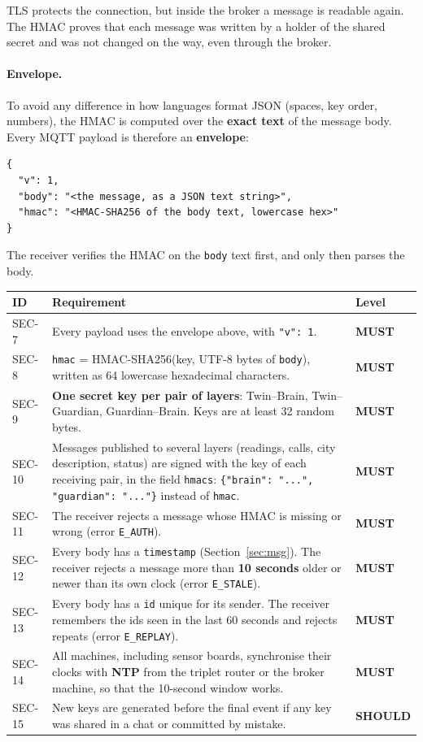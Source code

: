 \documentclass[11pt,a4paper]{article}
\newcommand{\code}[1]{\texttt{#1}}
\newcommand{\MUST}{\textbf{\textcolor{must}{MUST}}}
\newcommand{\SHOULD}{\textbf{\textcolor{should}{SHOULD}}}
\begin{document}
TLS protects the connection, but inside the broker a message is readable again. The HMAC proves that each message was written by a holder of the shared secret and was not changed on the way, even through the broker.

\paragraph{Envelope.} To avoid any difference in how languages format JSON (spaces, key order, numbers), the HMAC is computed over the \textbf{exact text} of the message body. Every MQTT payload is therefore an \textbf{envelope}:

\begin{lstlisting}
{
  "v": 1,
  "body": "<the message, as a JSON text string>",
  "hmac": "<HMAC-SHA256 of the body text, lowercase hex>"
}
\end{lstlisting}

The receiver verifies the HMAC on the \code{body} text first, and only then parses the body.

\begin{longtable}{@{}l p{10.9cm} l@{}}
\toprule
\textbf{ID} & \textbf{Requirement} & \textbf{Level} \\
\midrule
\endhead
SEC-7 & Every payload uses the envelope above, with \code{"v": 1}. & \MUST \\
SEC-8 & \code{hmac} = HMAC-SHA256(key, UTF-8 bytes of \code{body}), written as 64 lowercase hexadecimal characters. & \MUST \\
SEC-9 & \textbf{One secret key per pair of layers}: Twin--Brain, Twin--Guardian, Guardian--Brain. Keys are at least 32 random bytes. & \MUST \\
SEC-10 & Messages published to several layers (readings, calls, city description, status) are signed with the key of each receiving pair, in the field \code{hmacs}: \code{\{"brain": "...", "guardian": "..."\}} instead of \code{hmac}. & \MUST \\
SEC-11 & The receiver rejects a message whose HMAC is missing or wrong (error \code{E\_AUTH}). & \MUST \\
SEC-12 & Every body has a \code{timestamp} (Section~\ref{sec:msg}). The receiver rejects a message more than \textbf{10 seconds} older or newer than its own clock (error \code{E\_STALE}). & \MUST \\
SEC-13 & Every body has a \code{id} unique for its sender. The receiver remembers the ids seen in the last 60 seconds and rejects repeats (error \code{E\_REPLAY}). & \MUST \\
SEC-14 & All machines, including sensor boards, synchronise their clocks with \textbf{NTP} from the triplet router or the broker machine, so that the 10-second window works. & \MUST \\
SEC-15 & New keys are generated before the final event if any key was shared in a chat or committed by mistake. & \SHOULD \\
\bottomrule
\end{longtable}
\end{document}
